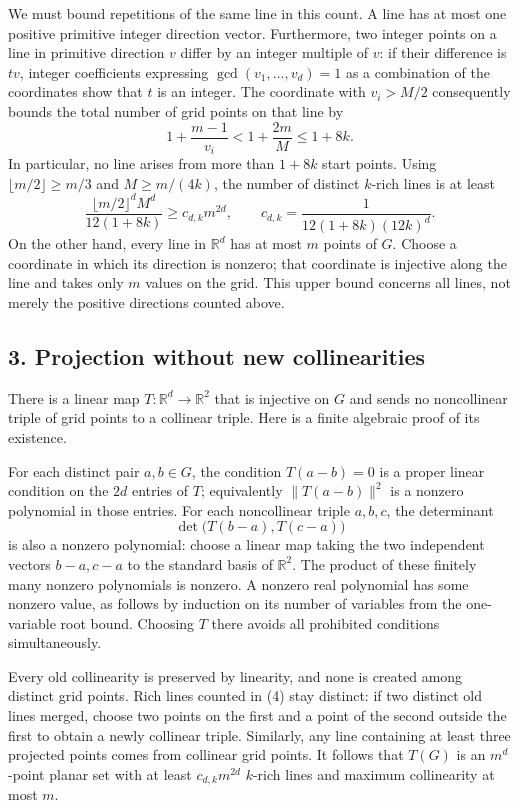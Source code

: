 We must bound repetitions of the same line in this count. A line has at most one positive primitive integer direction vector. Furthermore, two integer points on a line in primitive direction $v$ differ by an integer multiple of $v$: if their difference is $tv$, integer coefficients expressing $\gcd(v_1,\ldots,v_d)=1$ as a combination of the coordinates show that $t$ is an integer. The coordinate with $v_i>M/2$ consequently bounds the total number of grid points on that line by
\[
 1+\frac{m-1}{v_i}<1+\frac{2m}{M}\le1+8k.\tag{3}
\]
In particular, no line arises from more than $1+8k$ start points. Using $\lfloor m/2\rfloor\ge m/3$ and $M\ge m/(4k)$, the number of distinct $k$-rich lines is at least
\[
 \frac{\lfloor m/2\rfloor^dM^d}{12(1+8k)}
 \ge c_{d,k}m^{2d},\qquad
 c_{d,k}=\frac1{12(1+8k)(12k)^d}.\tag{4}
\]
On the other hand, every line in $\mathbb R^d$ has at most $m$ points of $G$. Choose a coordinate in which its direction is nonzero; that coordinate is injective along the line and takes only $m$ values on the grid. This upper bound concerns all lines, not merely the positive directions counted above.

\subsection*{3. Projection without new collinearities}
There is a linear map $T:\mathbb R^d\to\mathbb R^2$ that is injective on $G$ and sends no noncollinear triple of grid points to a collinear triple. Here is a finite algebraic proof of its existence.

For each distinct pair $a,b\in G$, the condition $T(a-b)=0$ is a proper linear condition on the $2d$ entries of $T$; equivalently $\|T(a-b)\|^2$ is a nonzero polynomial in those entries. For each noncollinear triple $a,b,c$, the determinant
\[
 \det\bigl(T(b-a),T(c-a)\bigr)
\]
is also a nonzero polynomial: choose a linear map taking the two independent vectors $b-a,c-a$ to the standard basis of $\mathbb R^2$. The product of these finitely many nonzero polynomials is nonzero. A nonzero real polynomial has some nonzero value, as follows by induction on its number of variables from the one-variable root bound. Choosing $T$ there avoids all prohibited conditions simultaneously.

Every old collinearity is preserved by linearity, and none is created among distinct grid points. Rich lines counted in (4) stay distinct: if two distinct old lines merged, choose two points on the first and a point of the second outside the first to obtain a newly collinear triple. Similarly, any line containing at least three projected points comes from collinear grid points. It follows that $T(G)$ is an $m^d$-point planar set with at least $c_{d,k}m^{2d}$ $k$-rich lines and maximum collinearity at most $m$.

